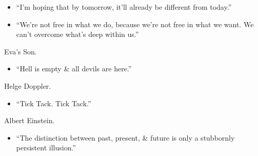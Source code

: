 \documentclass{article}
\begin{document}
\begin{enumerate}
\begin{itemize}
		\item ``I'm hoping that by tomorrow, it'll already be different from today.''
		\item ``We're not free in what we do, because we're not free in what we want. We can't overcome what's deep within us.''
	\end{itemize}
	{\sc Eva's Son.}
	\begin{itemize}
		\item ``Hell is empty \& all devils are here.''
	\end{itemize}
	{\sc Helge Doppler.}
	\begin{itemize}
		\item ``Tick Tack. Tick Tack.''
	\end{itemize}
	{\sc Albert Einstein.}
	\begin{itemize}
		\item ``The distinction between past, present, \& future is only a stubbornly persistent illusion.''
	\end{itemize}


\end{enumerate}
\end{document}

